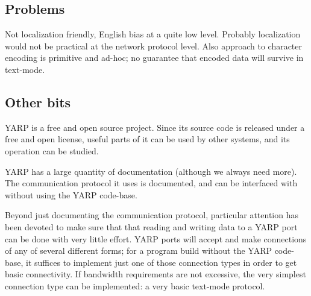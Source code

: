 

\subsection{Problems}

Not localization friendly, English bias at a quite low level.
Probably localization would not be practical at the network
protocol level.  Also approach to character encoding is
primitive and ad-hoc; no guarantee that encoded data
will survive in text-mode.


\subsection{Other bits}

YARP is a free and open source project.  Since its source code is
released under a free and open license, useful parts of it can be used
by other systems, and its operation can be studied.

YARP has a large quantity of documentation (although we always need
more).  The communication protocol it uses is documented, and can be
interfaced with without using the YARP code-base.

Beyond just documenting the communication protocol, particular attention
has been devoted to make sure that that reading and writing data to a
YARP port can be done with very little effort.  YARP ports will 
accept and make connections of any of several different forms;
for a program build without the YARP code-base, it suffices
to implement just one of those connection types in order to
get basic connectivity.  If bandwidth requirements are not
excessive, the very simplest connection type can be implemented:
a very basic text-mode protocol.

